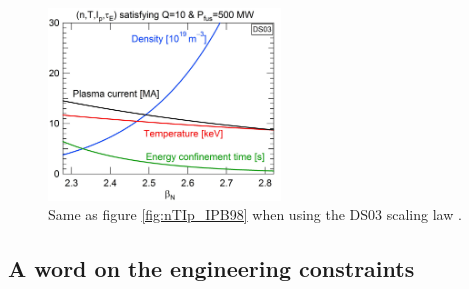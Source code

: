 \documentclass[12pt]{iopart}
\begin{document}
\begin{figure}[htbp]
	\begin{center}
		\includegraphics[width=0.55\textwidth]{ITER_DS03_betaN_n_T_Ip_tauE.jpg}
	\end{center}
	\caption{Same as figure \ref{fig:nTIp_IPB98} when using the DS03 scaling law \cite{Sips2018}.}
	\label{fig:nTIp_Sips2018}
\end{figure}


\subsection{A word on the engineering constraints} \label{subsec:radial_build}
\end{document}
